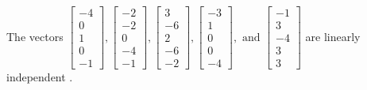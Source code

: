 \begin{exercise}
\begin{exerciseStatement}
  \end{exerciseStatement}
  \begin{exerciseAnswer}
   The vectors \(\left[\begin{array}{r}
-4 \\
0 \\
1 \\
0 \\
-1
\end{array}\right] , \left[\begin{array}{r}
-2 \\
-2 \\
0 \\
-4 \\
-1
\end{array}\right] , \left[\begin{array}{r}
3 \\
-6 \\
2 \\
-6 \\
-2
\end{array}\right] , \left[\begin{array}{r}
-3 \\
1 \\
0 \\
0 \\
-4
\end{array}\right] , \text{ and } \left[\begin{array}{r}
-1 \\
3 \\
-4 \\
3 \\
3
\end{array}\right]\) are 
  	 linearly independent  .
  


  \end{exerciseAnswer}
\end{exercise}
